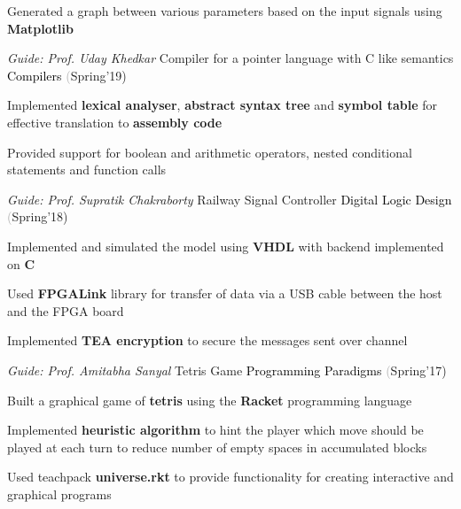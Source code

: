 \begin{cventries}
{\begin{cvitems}
        \item Generated a graph between various parameters based on the input signals using \textbf{Matplotlib} 
      \end{cvitems}
    }
  \cventry
    {\textit{Guide: Prof. Uday Khedkar}}
    {Compiler for a pointer language with C like semantics}
    {\textcolor{black} {Compilers}}
    {\fontsize{9pt}{1em} \textcolor{darkgray}(Spring'19)}
    {
      \begin{cvitems}
        \item Implemented \textbf{lexical analyser}, \textbf{abstract syntax tree} and \textbf{symbol table} for effective translation to \textbf{assembly code} \vspace{0.3mm}
        \item Provided support for boolean and arithmetic operators, nested conditional statements and function calls 
      \end{cvitems}
    }
  \cventry
    {\textit{Guide: Prof. Supratik Chakraborty}}
    {Railway Signal Controller}
    {\textcolor{black} {Digital Logic Design}}
    {\fontsize{9pt}{1em} \textcolor{darkgray}(Spring'18)}
    {
      \begin{cvitems}
        \item Implemented and simulated the model using \textbf{VHDL} with backend implemented on \textbf{C} \vspace{0.3mm}
        \item Used \textbf{FPGALink} library for transfer of data via a USB cable between the host and the FPGA board \vspace{0.3mm}
        \item Implemented \textbf{TEA encryption} to secure the messages sent over channel 
      \end{cvitems}
    }
  \cventry
    {\textit{Guide: Prof. Amitabha Sanyal}}
    {Tetris Game}
    {\textcolor{black} {Programming Paradigms}}
    {\fontsize{9pt}{1em} \textcolor{darkgray}(Spring'17)}
    {
      \begin{cvitems}
        \item Built a graphical game of \textbf{tetris} using the \textbf{Racket} programming language \vspace{0.3mm}
        \item Implemented \textbf{heuristic algorithm} to hint the player which move should be played at each turn to reduce
        number of empty spaces in accumulated blocks \vspace{0.3mm}
        \item Used teachpack \textbf{universe.rkt} to provide functionality for creating interactive and graphical programs
      \end{cvitems}
    }
  

\end{cventries}